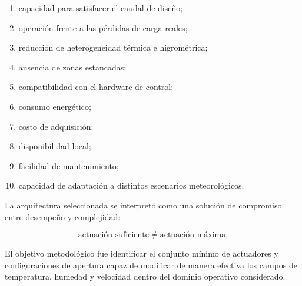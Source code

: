 \begin{enumerate}
    \item capacidad para satisfacer el caudal de diseño;
    \item operación frente a las pérdidas de carga reales;
    \item reducción de heterogeneidad térmica e higrométrica;
    \item ausencia de zonas estancadas;
    \item compatibilidad con el hardware de control;
    \item consumo energético;
    \item costo de adquisición;
    \item disponibilidad local;
    \item facilidad de mantenimiento;
    \item capacidad de adaptación a distintos escenarios meteorológicos.
\end{enumerate}

La arquitectura seleccionada se interpretó como una solución de compromiso entre desempeño y complejidad:

\begin{equation}
\boxed{
\text{actuación suficiente}
\neq
\text{actuación máxima}.
}
\end{equation}

El objetivo metodológico fue identificar el conjunto mínimo de actuadores y configuraciones de apertura capaz de modificar de manera efectiva los campos de temperatura, humedad y velocidad dentro del dominio operativo considerado.